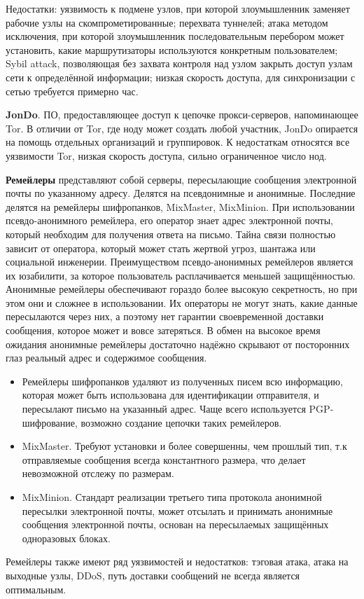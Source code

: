 Недостатки: уязвимость к подмене узлов, при которой  злоумышленник заменяет рабочие узлы на скомпрометированные; перехвата туннелей; атака методом исключения, при которой злоумышленник последовательным перебором может установить, какие маршрутизаторы используются конкретным пользователем; %
Sybil attack, позволяющая без захвата контроля над узлом закрыть доступ узлам сети 	к определённой информации; низкая скорость доступа, для синхронизации с сетью требуется примерно час.

\textbf{JonDo}. ПО, предоставляющее доступ к цепочке прокси-серверов, напоминающее Tor. В отличии  от  Tor, где ноду может создать любой участник, JonDo опирается на помощь отдельных организаций и группировок. К недостаткам относятся все уязвимости Tor, низкая скорость доступа, сильно ограниченное число нод.

\textbf{Ремейлеры} представляют собой серверы, пересылающие сообщения электронной почты по указанному адресу. Делятся на псевдонимные и анонимные. Последние делятся на ремейлеры шифропанков, MixMaster, MixMinion. При использовании псевдо-анонимного ремейлера, его оператор знает адрес электронной почты, который необходим для получения ответа на письмо. Тайна связи полностью зависит от оператора, который может стать жертвой угроз, шантажа или социальной инженерии. Преимуществом псевдо-анонимных ремейлеров является их юзабилити, за которое пользователь расплачивается меньшей защищённостью. Анонимные ремейлеры обеспечивают гораздо более высокую секретность, но при этом они и сложнее в использовании. Их операторы не могут знать, какие данные пересылаются через них, а поэтому нет гарантии своевременной доставки сообщения, которое может и вовсе затеряться.%
В обмен на высокое время ожидания анонимные ремейлеры достаточно надёжно скрывают от посторонних глаз реальный адрес и содержимое сообщения. 
\begin{itemize}
	\item Ремейлеры шифропанков удаляют из полученных писем всю информацию, которая может быть использована для идентификации отправителя, и пересылают письмо на указанный адрес. Чаще всего используется PGP-шифрование, возможно создание цепочки таких ремейлеров.
	\item MixMaster. Требуют установки и более совершенны, чем прошлый тип, т.к отправляемые сообщения всегда константного размера, что делает невозможной отслежу по размерам.
	\item MixMinion.  Стандарт реализации третьего типа протокола анонимной пересылки электронной почты, может отсылать и принимать анонимные сообщения электронной почты, основан на пересылаемых защищённых одноразовых блоках. %
\end{itemize}
Ремейлеры также имеют ряд уязвимостей и недостатков: тэговая атака, атака на выходные узлы, DDoS, путь доставки сообщений не всегда является оптимальным.

